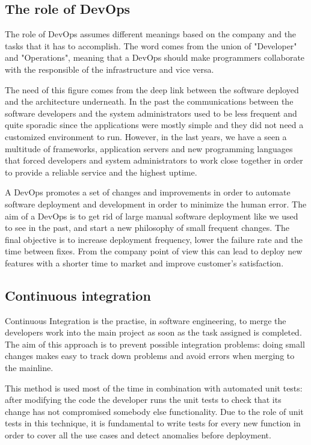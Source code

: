\subsection{The role of DevOps}

The role of DevOps assumes different meanings based on the company and the
tasks that it has to accomplish. The word comes from the union of
"Developer" and "Operations", meaning that a DevOps should make
programmers collaborate with the responsible of the infrastructure and
vice versa.

The need of this figure comes from the deep link between the software
deployed and the architecture underneath. In the past the communications
between the software developers and the system administrators used to be
less frequent and quite sporadic since the applications were mostly simple
and they did not need a customized environment to run. However, in the
last years, we have a seen a multitude of frameworks, application servers
and new programming languages that forced developers and system
administrators to work close together in order to provide a reliable
service and the highest uptime.

A DevOps promotes a set of changes and improvements in order to automate
software deployment and development in order to minimize the human error.
The aim of a DevOps is to get rid of large manual software deployment like
we used to see in the past, and start a new philosophy of small frequent
changes. The final objective is to increase deployment frequency, lower
the failure rate and the time between fixes. From the company point of
view this can lead to deploy new features with a shorter time to market
and improve customer's satisfaction.

\subsection{Continuous integration}

Continuous Integration is the practise, in software engineering, to merge
the developers work into the main project as soon as the task assigned is
completed. The aim of this approach is to prevent possible integration
problems: doing small changes makes easy to track down problems and avoid
errors when merging to the mainline.

This method is used most of the time in combination with automated unit tests:
after modifying the code the developer runs the unit tests to check that
its change has not compromised somebody else functionality. Due to the
role of unit tests in this technique, it is fundamental to write tests for
every new function in order to cover all the use cases and detect
anomalies before deployment.


